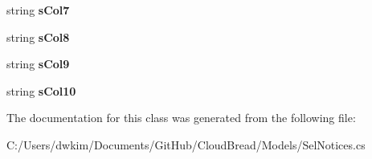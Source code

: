 \begin{DoxyCompactItemize}
\item 
string {\bfseries s\+Col7}\hypertarget{a00103_a924451430e51c6b1c3ee7bed58322aea}{}\label{a00103_a924451430e51c6b1c3ee7bed58322aea}

\item 
string {\bfseries s\+Col8}\hypertarget{a00103_a0d0b3d9cf80954633b770fecf90274cf}{}\label{a00103_a0d0b3d9cf80954633b770fecf90274cf}

\item 
string {\bfseries s\+Col9}\hypertarget{a00103_a8682c04d7021f506369df7d6d64539e3}{}\label{a00103_a8682c04d7021f506369df7d6d64539e3}

\item 
string {\bfseries s\+Col10}\hypertarget{a00103_ab529ff55f907949a782c1d56c67f4bcc}{}\label{a00103_ab529ff55f907949a782c1d56c67f4bcc}

\end{DoxyCompactItemize}


The documentation for this class was generated from the following file\+:\begin{DoxyCompactItemize}
\item 
C\+:/\+Users/dwkim/\+Documents/\+Git\+Hub/\+Cloud\+Bread/\+Models/Sel\+Notices.\+cs\end{DoxyCompactItemize}
